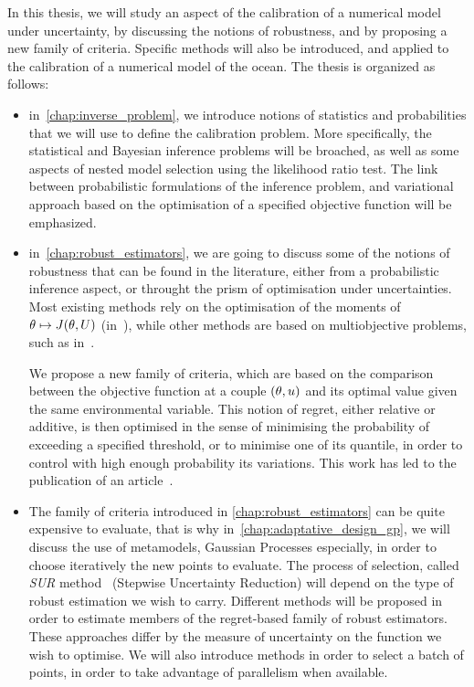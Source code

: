 \documentclass[../../Main_ManuscritThese.tex]{subfiles}
\begin{document}
In this thesis, we will study an aspect of the calibration of a
numerical model under uncertainty, by discussing the notions of
robustness, and by proposing a new family of criteria.  Specific
methods will also be introduced, and applied to the calibration of a
numerical model of the ocean. The thesis is organized as follows:
\begin{itemize}
\item in~\cref{chap:inverse_problem}, we introduce notions of
  statistics and probabilities that we will use to define the
  calibration problem. More specifically, the statistical and Bayesian
  inference problems will be broached, as well as some aspects of
  nested model selection using the likelihood ratio test. The link
  between probabilistic formulations of the inference problem, and
  variational approach based on the optimisation of a specified
  objective function will be emphasized.
  
\item in~\cref{chap:robust_estimators}, we are going to discuss some
  of the notions of robustness that can be found in the literature,
  either from a probabilistic inference aspect, or throught the prism
  of optimisation under uncertainties. Most existing methods rely on
  the optimisation of the moments of $\theta\mapsto J(\theta,U)$
  (in~\cite{lehman_designing_2004,janusevskis_simultaneous_2010}),
  while other methods are based on multiobjective problems, such as
  in~\cite{baudoui_optimisation_2012,ribaud_krigeage_2018}.%

  We propose a new family of criteria, which are based on the
  comparison between the objective function at a couple $(\theta,u)$
  and its optimal value given the same environmental variable. This
  notion of regret, either relative or additive, is then optimised in
  the sense of minimising the probability of exceeding a specified
  threshold, or to minimise one of its quantile, in order to control
  with high enough probability its variations. This work has led to
  the publication of an article~\cite{trappler_robust_2020}.
  
\item The family of criteria introduced in
  \cref{chap:robust_estimators} can be quite expensive to evaluate,
  that is why in~\cref{chap:adaptative_design_gp}, we will discuss the
  use of metamodels, Gaussian Processes especially, in order to choose
  iteratively the new points to evaluate. The process of selection,
  called \emph{SUR} method~\cite{bect_sequential_2012} (Stepwise
  Uncertainty Reduction) will depend on the type of robust estimation
  we wish to carry. Different methods will be proposed in order to
  estimate members of the regret-based family of robust
  estimators. These approaches differ by the measure of uncertainty on
  the function we wish to optimise. We will also introduce methods in
  order to select a batch of points, in order to take advantage of
  parallelism when available.


\end{itemize}
\end{document}
